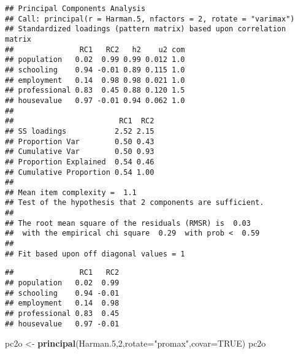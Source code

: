 \documentclass[]{book}
\newenvironment{Shaded}{\begin{snugshade}}{\end{snugshade}}
\newcommand{\KeywordTok}[1]{\textcolor[rgb]{0.13,0.29,0.53}{\textbf{{#1}}}}
\newcommand{\DataTypeTok}[1]{\textcolor[rgb]{0.13,0.29,0.53}{{#1}}}
\newcommand{\DecValTok}[1]{\textcolor[rgb]{0.00,0.00,0.81}{{#1}}}
\newcommand{\FloatTok}[1]{\textcolor[rgb]{0.00,0.00,0.81}{{#1}}}
\newcommand{\StringTok}[1]{\textcolor[rgb]{0.31,0.60,0.02}{{#1}}}
\newcommand{\CommentTok}[1]{\textcolor[rgb]{0.56,0.35,0.01}{\textit{{#1}}}}
\newcommand{\OtherTok}[1]{\textcolor[rgb]{0.56,0.35,0.01}{{#1}}}
\newcommand{\NormalTok}[1]{{#1}}
\begin{document}
\begin{verbatim}
## Principal Components Analysis
## Call: principal(r = Harman.5, nfactors = 2, rotate = "varimax")
## Standardized loadings (pattern matrix) based upon correlation matrix
##               RC1   RC2   h2    u2 com
## population   0.02  0.99 0.99 0.012 1.0
## schooling    0.94 -0.01 0.89 0.115 1.0
## employment   0.14  0.98 0.98 0.021 1.0
## professional 0.83  0.45 0.88 0.120 1.5
## housevalue   0.97 -0.01 0.94 0.062 1.0
## 
##                        RC1  RC2
## SS loadings           2.52 2.15
## Proportion Var        0.50 0.43
## Cumulative Var        0.50 0.93
## Proportion Explained  0.54 0.46
## Cumulative Proportion 0.54 1.00
## 
## Mean item complexity =  1.1
## Test of the hypothesis that 2 components are sufficient.
## 
## The root mean square of the residuals (RMSR) is  0.03 
##  with the empirical chi square  0.29  with prob <  0.59 
## 
## Fit based upon off diagonal values = 1
\end{verbatim}

\begin{Shaded}
\end{Shaded}

\begin{verbatim}
##               RC1   RC2
## population   0.02  0.99
## schooling    0.94 -0.01
## employment   0.14  0.98
## professional 0.83  0.45
## housevalue   0.97 -0.01
\end{verbatim}

\begin{Shaded}
\begin{Highlighting}[]
\NormalTok{pc2o <-}\StringTok{ }\KeywordTok{principal}\NormalTok{(Harman}\FloatTok{.5}\NormalTok{,}\DecValTok{2}\NormalTok{,}\DataTypeTok{rotate=}\StringTok{"promax"}\NormalTok{,}\DataTypeTok{covar=}\OtherTok{TRUE}\NormalTok{)}
\NormalTok{pc2o}
\end{Highlighting}
\end{Shaded}
\end{document}
